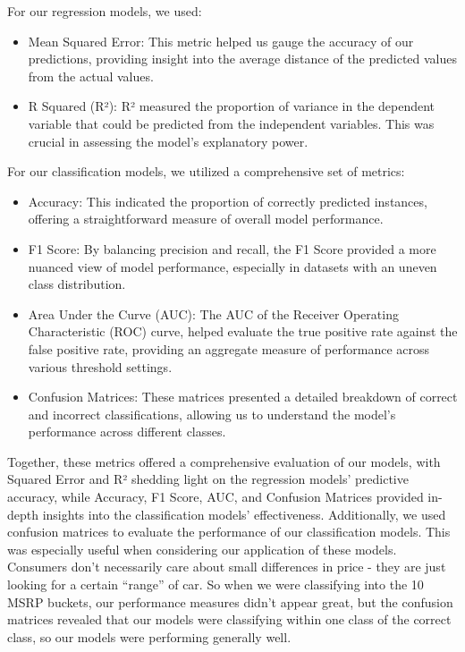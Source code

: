 \documentclass{article}
\begin{document}
For our regression models, we used:
\begin{itemize}
    \item Mean Squared Error: This metric helped us gauge the accuracy of our predictions, providing insight into the average distance of the predicted values from the actual values.
    \item R Squared (R²): R² measured the proportion of variance in the dependent variable that could be predicted from the independent variables. This was crucial in assessing the model's explanatory power.
\end{itemize}

For our classification models, we utilized a comprehensive set of metrics:
\begin{itemize}
    \item Accuracy: This indicated the proportion of correctly predicted instances, offering a straightforward measure of overall model performance.
    \item F1 Score: By balancing precision and recall, the F1 Score provided a more nuanced view of model performance, especially in datasets with an uneven class distribution.
    \item Area Under the Curve (AUC): The AUC of the Receiver Operating Characteristic (ROC) curve, helped evaluate the true positive rate against the false positive rate, providing an aggregate measure of performance across various threshold settings.
    \item Confusion Matrices: These matrices presented a detailed breakdown of correct and incorrect classifications, allowing us to understand the model's performance across different classes.
\end{itemize}

Together, these metrics offered a comprehensive evaluation of our models, with Squared Error and R² shedding light on the regression models' predictive accuracy, while Accuracy, F1 Score, AUC, and Confusion Matrices provided in-depth insights into the classification models' effectiveness.
\newline
\newline
Additionally, we used confusion matrices to evaluate the performance of our classification models. This was especially useful when considering our application of these models. Consumers don't necessarily care about small differences in price - they are just looking for a certain “range” of car. So when we were classifying into the 10 MSRP buckets, our performance measures didn’t appear great, but the confusion matrices revealed that our models were classifying within one class of the correct class, so our models were performing generally well.
\end{document}
